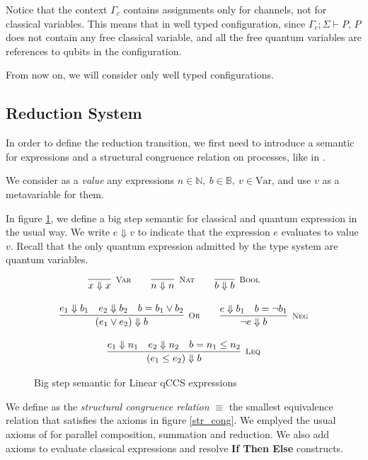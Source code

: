 Notice that the context $\Gamma_c$ contains assignments only for channels, not for classical variables. This means that in well typed configuration, since $\Gamma_c; \Sigma \vdash P$, $P$ does not contain any free classical variable, and all the free quantum variables are references to qubits in the configuration.

From now on, we will consider only well typed configurations.

\subsection{Reduction System}
In order to define the reduction transition, we first need to introduce a semantic for expressions and a structural congruence relation on processes, like in \cite{gayCommunicatingQuantumProcesses2005}.

We consider as a \textit{value} any expressions $n \in \mathbb{N},\  b \in \mathbb{B},\  v \in  \text{Var}$, and use $v$ as a metavariable for them.

In figure \ref{big_step_exp}, we define a big step semantic for classical and quantum expression in the usual way. We write $e \Downarrow v$ to indicate that the expression $e$ evaluates to value $v$. Recall that the only quantum expression admitted by the type system are quantum variables.

\begin{figure}[h!]
\begin{gather*}
\infer[\mbox{\footnotesize\scshape Var}]{x \Downarrow x}{} \qquad
    \infer[\mbox{\footnotesize\scshape Nat}]{n \Downarrow n}{} \qquad
    \infer[\mbox{\footnotesize\scshape Bool}]{b \Downarrow b}{}  \qquad
\\[0.3cm]
    \infer[\mbox{\footnotesize\scshape Or}]{(e_1 \lor e_2) \Downarrow b}{e_1 \Downarrow b_1 & e_2 \Downarrow b_2 & b = b_1 \lor b_2} \qquad
    \infer[\mbox{\footnotesize\scshape Neg}]{\neg e \Downarrow b}{e \Downarrow b_1 & b = \neg b_1} \\[0.3cm]
    \infer[\mbox{\footnotesize\scshape Leq}]{(e_1 \leq e_2) \Downarrow b}{e_1 \Downarrow n_1 & e_2 \Downarrow n_2 & b = n_1 \leq n_2}
\end{gather*}
\caption{Big step semantic for Linear qCCS expressions}
\label{big_step_exp}
\end{figure}

We define as the \textit{structural congruence relation} $\equiv$ the smallest equivalence relation that satisfies the axioms in figure \ref{str_cong}. We emplyed the usual axioms of \cite{milnerFunctionsProcesses1990} for parallel composition, summation and reduction. We also add axioms to evaluate classical expressions and resolve \textbf{If Then Else} constructs.

